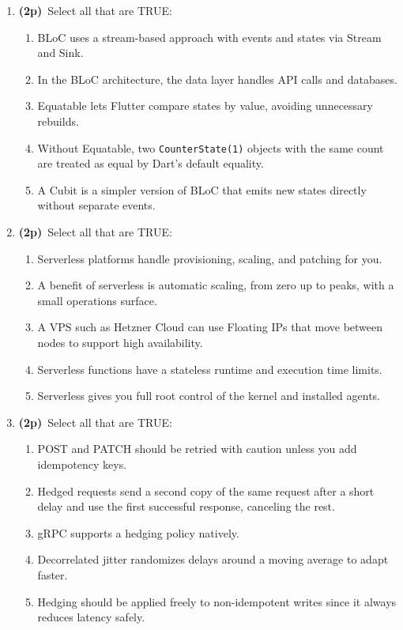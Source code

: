 \documentclass[11pt]{article}
\newcommand{\pts}{\textbf{(2p)}~}
\begin{document}
\begin{enumerate}
    \item \pts Select all that are TRUE:
    \begin{enumerate}
      \item BLoC uses a stream-based approach with events and states via Stream and Sink.
      \item In the BLoC architecture, the data layer handles API calls and databases.
      \item Equatable lets Flutter compare states by value, avoiding unnecessary rebuilds.
      \item Without Equatable, two \texttt{CounterState(1)} objects with the same count are treated as equal by Dart's default equality.
      \item A Cubit is a simpler version of BLoC that emits new states directly without separate events.
    \end{enumerate}

    \item \pts Select all that are TRUE:
    \begin{enumerate}
      \item Serverless platforms handle provisioning, scaling, and patching for you.
      \item A benefit of serverless is automatic scaling, from zero up to peaks, with a small operations surface.
      \item A VPS such as Hetzner Cloud can use Floating IPs that move between nodes to support high availability.
      \item Serverless functions have a stateless runtime and execution time limits.
      \item Serverless gives you full root control of the kernel and installed agents.
    \end{enumerate}

    \item \pts Select all that are TRUE:
    \begin{enumerate}
      \item POST and PATCH should be retried with caution unless you add idempotency keys.
      \item Hedged requests send a second copy of the same request after a short delay and use the first successful response, canceling the rest.
      \item gRPC supports a hedging policy natively.
      \item Decorrelated jitter randomizes delays around a moving average to adapt faster.
      \item Hedging should be applied freely to non-idempotent writes since it always reduces latency safely.
    \end{enumerate}

  \end{enumerate}
\end{document}
